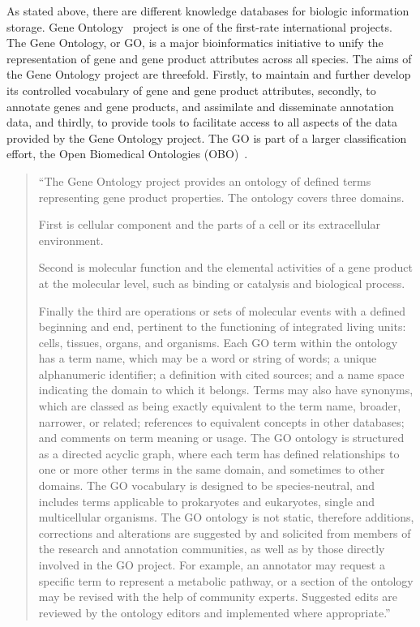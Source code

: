 As stated above, there are different knowledge databases for biologic information storage.
Gene Ontology~\cite{GO_website} project is one of the first-rate international projects.
The Gene Ontology, or GO, is a major bioinformatics initiative to unify the representation of gene and gene product attributes across all species.
The aims of the Gene Ontology project are threefold. Firstly, to maintain and further develop its controlled vocabulary of gene and gene product attributes,
secondly, to annotate genes and gene products, and assimilate and disseminate annotation data,
and thirdly, to provide tools to facilitate access to all aspects of the data provided by the Gene Ontology project.
The GO is part of a larger classification effort, the Open Biomedical Ontologies (OBO)~\cite{OBO}.

\begin{quotation}
``The Gene Ontology project provides an ontology of defined terms representing gene product properties.
The ontology covers three domains.


First is cellular component and the parts of a cell or its extracellular environment.


Second is molecular function and the elemental activities of a gene product at the molecular level, such as binding or catalysis and biological process.


Finally the third are operations or sets of molecular events with a defined beginning and end, pertinent to the functioning of integrated living units: cells, tissues, organs, and organisms. Each GO term within the ontology has a term name, which may be a word or string of words;
a unique alphanumeric identifier; a definition with cited sources; and a name space indicating the domain to which it belongs.
Terms may also have synonyms, which are classed as being exactly equivalent to the term name, broader, narrower, or related; references to equivalent concepts in other databases;
and comments on term meaning or usage. The GO ontology is structured as a directed acyclic graph, where each term has defined relationships to one or more other terms in the same domain, and sometimes to other domains. The GO vocabulary is designed to be species-neutral,
and includes terms applicable to prokaryotes and eukaryotes, single and multicellular organisms.
The GO ontology is not static, therefore additions, corrections and alterations are suggested by and solicited from members of the research and annotation communities, as well as by those directly involved in the GO project.
For example, an annotator may request a specific term to represent a metabolic pathway, or a section of the ontology may be revised with the help of community experts.
Suggested edits are reviewed by the ontology editors and implemented where appropriate.''\cite{Gene_Ontology}
\end{quotation}

